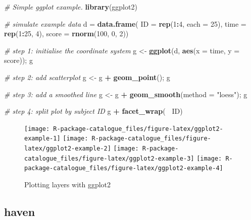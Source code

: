\documentclass[]{book}
\newenvironment{Shaded}{\begin{snugshade}}{\end{snugshade}}
\newcommand{\KeywordTok}[1]{\textcolor[rgb]{0.13,0.29,0.53}{\textbf{#1}}}
\newcommand{\DataTypeTok}[1]{\textcolor[rgb]{0.13,0.29,0.53}{#1}}
\newcommand{\DecValTok}[1]{\textcolor[rgb]{0.00,0.00,0.81}{#1}}
\newcommand{\StringTok}[1]{\textcolor[rgb]{0.31,0.60,0.02}{#1}}
\newcommand{\CommentTok}[1]{\textcolor[rgb]{0.56,0.35,0.01}{\textit{#1}}}
\newcommand{\OperatorTok}[1]{\textcolor[rgb]{0.81,0.36,0.00}{\textbf{#1}}}
\newcommand{\NormalTok}[1]{#1}
\begin{document}
\begin{Shaded}
\begin{Highlighting}[]
\CommentTok{# Simple ggplot example.}
\KeywordTok{library}\NormalTok{(ggplot2)}

\CommentTok{# simulate example data }
\NormalTok{d =}\StringTok{ }\KeywordTok{data.frame}\NormalTok{(}
  \DataTypeTok{ID    =} \KeywordTok{rep}\NormalTok{(}\DecValTok{1}\OperatorTok{:}\DecValTok{4}\NormalTok{, }\DataTypeTok{each =} \DecValTok{25}\NormalTok{),}
  \DataTypeTok{time  =} \KeywordTok{rep}\NormalTok{(}\DecValTok{1}\OperatorTok{:}\DecValTok{25}\NormalTok{, }\DecValTok{4}\NormalTok{), }
  \DataTypeTok{score =} \KeywordTok{rnorm}\NormalTok{(}\DecValTok{100}\NormalTok{, }\DecValTok{0}\NormalTok{, }\DecValTok{2}\NormalTok{))}

\CommentTok{# step 1: initialise the coordinate system}
\NormalTok{g <-}\StringTok{ }\KeywordTok{ggplot}\NormalTok{(d, }\KeywordTok{aes}\NormalTok{(}\DataTypeTok{x =}\NormalTok{ time, }\DataTypeTok{y =}\NormalTok{ score)); g}

\CommentTok{# step 2: add scatterplot}
\NormalTok{g <-}\StringTok{ }\NormalTok{g }\OperatorTok{+}\StringTok{ }\KeywordTok{geom_point}\NormalTok{(); g}

\CommentTok{# step 3: add a smoothed line}
\NormalTok{g <-}\StringTok{ }\NormalTok{g }\OperatorTok{+}\StringTok{ }\KeywordTok{geom_smooth}\NormalTok{(}\DataTypeTok{method =} \StringTok{"loess"}\NormalTok{); g}

\CommentTok{# step 4: split plot by subject ID}
\NormalTok{g }\OperatorTok{+}\StringTok{ }\KeywordTok{facet_wrap}\NormalTok{(}\OperatorTok{~}\StringTok{ }\NormalTok{ID)}
\end{Highlighting}
\end{Shaded}

\begin{figure}

{\centering \texttt{[image: R-package-catalogue\_files/figure-latex/ggplot2-example-1]} \texttt{[image: R-package-catalogue\_files/figure-latex/ggplot2-example-2]} \texttt{[image: R-package-catalogue\_files/figure-latex/ggplot2-example-3]} \texttt{[image: R-package-catalogue\_files/figure-latex/ggplot2-example-4]} 

}

\caption{Plotting layers with ggplot2}\label{fig:ggplot2-example}
\end{figure}

\subsection{haven}\label{haven}
\end{document}
